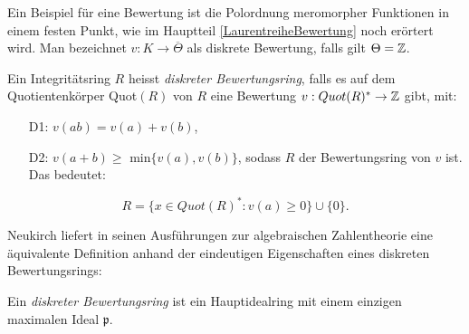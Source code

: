 Ein Beispiel für eine Bewertung ist die Polordnung meromorpher Funktionen in einem festen Punkt, wie im Hauptteil \ref*{LaurentreiheBewertung} noch erörtert wird. 
Man bezeichnet $v\colon K \to \overline{\Theta} $ als diskrete Bewertung, falls gilt ${\Theta} = \mathbb{Z}$.
%
\begin{defn} %
Ein Integritätsring $R$ heisst \textit{diskreter Bewertungsring}, falls es auf dem Quotientenkörper Quot$(R)$ von $R$ eine Bewertung $v: Quot(R)^* \rightarrow \mathbb{Z}$ gibt, mit:
\begin{enumerate}
\item[D1: ]$v(ab) = v(a)+ v(b)$, 
\item[D2: ] $v(a+b) \ge$ min$\lbrace v(a), v(b)\rbrace$,
sodass $R$ der Bewertungsring von $v$ ist. Das bedeutet:
\end{enumerate}
\[R = \lbrace x \in Quot(R)^*: v(a) \ge 0 \rbrace \cup \lbrace 0 \rbrace.\]
\end{defn}
Neukirch liefert in seinen Ausführungen zur algebraischen Zahlentheorie \cite[S. 126]{neukirch92} eine äquivalente Definition anhand der eindeutigen Eigenschaften eines diskreten Bewertungsrings:
\begin{defn} %
Ein \textit{diskreter Bewertungsring} ist ein Hauptidealring mit einem einzigen maximalen Ideal $\mathfrak{p}$.
\end{defn} 
%
